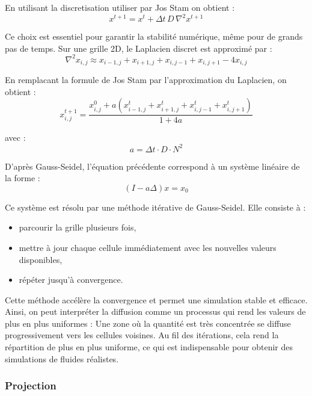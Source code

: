 \documentclass[a4paper]{article}
\begin{document}
En utilisant la discretisation utiliser par Jos Stam on obtient :
\begin{equation*}
    x^{t+1} = x^t + \Delta t \, D \, \nabla^2 x^{t+1}
\end{equation*}

Ce choix est essentiel pour garantir la stabilité numérique, même pour de grands pas de temps. Sur une grille 2D, le Laplacien discret est approximé par :
\begin{equation*}
    \nabla^2 x_{i,j} \approx x_{i-1,j} + x_{i+1,j} + x_{i,j-1} + x_{i,j+1} - 4x_{i,j}
\end{equation*}

En remplacant la formule de Jos Stam par l'approximation du Laplacien, on obtient :
\begin{equation*}
    x_{i,j}^{t+1} = \frac{x_{i,j}^{0} + a \left(x_{i-1,j}^{t} + x_{i+1,j}^{t} + x_{i,j-1}^{t} + x_{i,j+1}^{t}\right)}{1 + 4a}
\end{equation*}

avec :
\begin{equation*}
    a = \Delta t \cdot D \cdot N^2
\end{equation*}

D'après Gauss-Seidel, l'équation précédente correspond à un système linéaire de la forme :
\begin{equation*}
    (I - a \Delta)x = x_0
\end{equation*}

Ce système est résolu par une méthode itérative de Gauss-Seidel. Elle consiste à :
\begin{itemize}
    \item parcourir la grille plusieurs fois,
    \item mettre à jour chaque cellule immédiatement avec les nouvelles valeurs disponibles,
    \item répéter jusqu'à convergence.
\end{itemize}

Cette méthode accélère la convergence et permet une simulation stable et efficace. Ainsi, on peut interpréter la diffusion comme un processus qui rend les valeurs de plus en plus uniformes : Une zone où la quantité est très concentrée se diffuse progressivement vers les cellules voisines. Au fil des itérations, cela rend la répartition de plus en plus uniforme, ce qui est indispensable pour obtenir des simulations de fluides réalistes.


\subsubsection{Projection}
\end{document}
